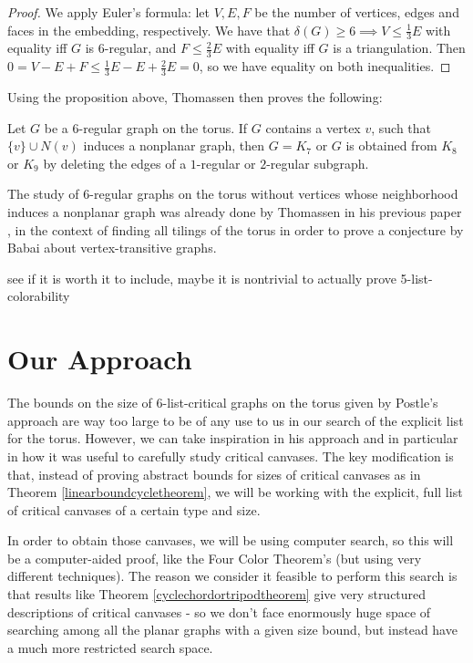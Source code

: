 \begin{proof}
We apply Euler's formula: let $V, E, F$ be the number of vertices, edges and faces in the embedding, respectively. 
We have that $\delta(G) \geq 6 \implies V \leq \frac{1}{3} E$ with equality iff $G$ is $6$-regular, and $F \leq \frac{2}{3}E$ 
with equality iff $G$ is a triangulation. Then $0 = V - E + F \leq \frac{1}{3}E - E + \frac{2}{3}E = 0$, so we have equality on both inequalities.
\end{proof}

Using the proposition above, Thomassen then proves the following:

\begin{proposition}
Let $G$ be a $6$-regular graph on the torus. If $G$ contains a vertex $v$, such that $\{v\} \cup N(v)$ induces a nonplanar graph, then $G = K_7$ or $G$ is obtained from $K_8$ or $K_9$ by deleting the edges of a $1$-regular or $2$-regular subgraph.
\end{proposition}

The study of $6$-regular graphs on the torus without vertices whose neighborhood induces a nonplanar graph was already done by Thomassen in his previous paper \cite{thomassentilings}, in the context of finding all tilings of the torus in order to prove a conjecture by Babai about vertex-transitive graphs. 


 see if it is worth it to include, maybe it is nontrivial to actually prove 5-list-colorability




\section{Our Approach}

The bounds on the size of $6$-list-critical graphs on the torus given by Postle's approach are 
way too large to be of any use to us in our search of the explicit list for the torus. However, 
we can take inspiration in his approach and in particular in how it was useful to carefully study
critical canvases. The key modification is that, instead of proving abstract bounds for sizes
of critical canvases as in Theorem \ref{linearboundcycletheorem}, we will be working with the 
explicit, full list of critical canvases of a certain type and size. 

In order to obtain those canvases, we will be using computer search, so this will be a 
computer-aided proof, like the Four Color Theorem's (but using very different techniques). The 
reason we consider it feasible to perform this search is that results like 
Theorem \ref{cyclechordortripodtheorem} give very structured descriptions of 
critical canvases - so we don't face enormously huge space of searching among
all the planar graphs with a given size bound, but instead have a much more restricted
search space. 

